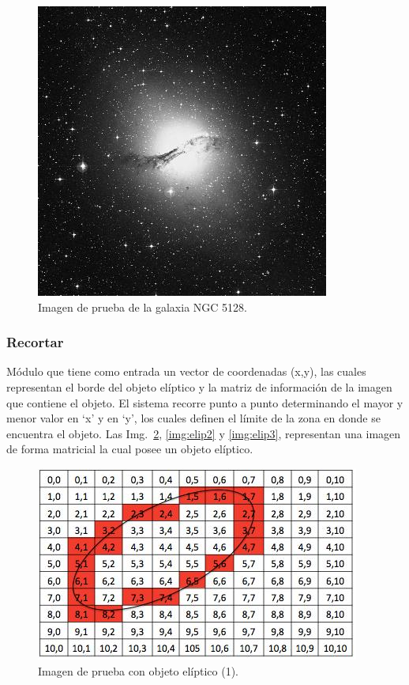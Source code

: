 \begin{figure}[ht!]
	\begin{center}
		\includegraphics[scale=.5]{img/ngc}
	\end{center}
	\caption{Imagen de prueba de la galaxia NGC 5128.}\label{img:ngc}
\end{figure}

\subsubsection{Recortar}

Módulo que tiene como entrada un vector de coordenadas (x,y), las cuales representan el borde del objeto elíptico y la matriz de información de la imagen que contiene el objeto. El sistema recorre punto a punto determinando el mayor y menor valor en ‘x’ y en ‘y’, los cuales definen el límite de la zona en donde se encuentra el objeto. Las Img.~\ref{img:elip1}, \ref{img:elip2} y \ref{img:elip3}, representan una imagen de forma matricial la cual posee un objeto elíptico.

\begin{figure}[ht!]
	\centering
	\includegraphics[scale=.5]{img/elip1}
	\caption{Imagen de prueba con objeto elíptico (1).}\label{img:elip1}
\end{figure}

